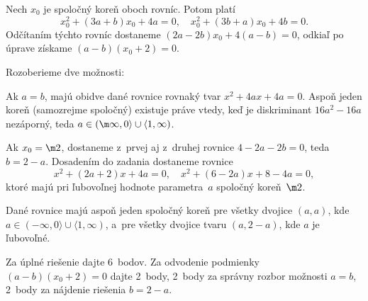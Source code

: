 {%
Nech $x_0$ je spoločný koreň oboch rovníc. Potom platí
$$
x_0^2+(3a+b)x_0+4a=0, \quad x_0^2+(3b+a)x_0+4b=0.
$$
Odčítaním týchto rovníc dostaneme $(2a-2b)x_0+4(a-b)=0$, odkiaľ po úprave získame $(a-b)(x_0+2)=0$.

Rozoberieme dve možnosti:

Ak $a=b$, majú obidve dané rovnice rovnaký tvar $x^2+4ax+4a=0$. Aspoň jeden koreň (samozrejme spoločný) existuje práve vtedy, keď je diskriminant $16a^2-16a$ nezáporný, teda $a\in(\m\infty,0\rangle\cup\langle1,\infty)$.

Ak $x_0=\m2$, dostaneme z~prvej aj z~druhej rovnice $4-2a-2b=0$, teda $b=2-a$. Dosadením do zadania dostaneme rovnice
$$
x^2+(2a+2)x+4a=0,\quad x^2+(6-2a)x+8-4a=0,
$$ ktoré majú pri ľubovoľnej hodnote parametra~$a$ spoločný koreň~$\m2$.

\zaver
Dané rovnice majú aspoň jeden spoločný koreň pre všetky dvojice $(a,a)$, kde $a\in (-\infty, 0\rangle \cup \langle 1,\infty)$, a~pre všetky dvojice tvaru ${(a,2-a)}$, kde $a$ je ľubovoľné.

\nobreak\medskip\petit\noindent
Za úplné riešenie dajte 6~bodov. Za odvodenie podmienky $(a-b)(x_0+2)=0$ dajte 2~body, 2~body za správny rozbor možnosti $a=b$, 2~body za nájdenie riešenia $b=2-a$.
\endpetit
\bigbreak}

